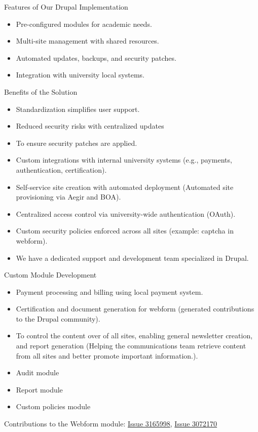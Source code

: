 \begin{frame}{Features of Our Drupal Implementation}
    \begin{itemize}
        \item Pre-configured modules for academic needs.
        \item Multi-site management with shared resources.
        \item Automated updates, backups, and security patches.
        \item Integration with university local systems.
    \end{itemize}
\end{frame}

\begin{frame}{Benefits of the Solution}
    \begin{itemize}
        \item Standardization simplifies user support.
        \item Reduced security risks with centralized updates
        \item To ensure security patches are applied.
        \item Custom integrations with internal university systems (e.g., payments, authentication, certification).
        \item Self-service site creation with automated deployment (Automated site provisioning via Aegir and BOA).
        \item Centralized access control via university-wide authentication (OAuth).
        \item Custom security policies enforced across all sites (example: captcha in webform).
        \item We have a dedicated support and development team specialized in Drupal.
    \end{itemize}
\end{frame}

\begin{frame}{Custom Module Development}
    \begin{itemize}
        \item Payment processing and billing using local payment system.
        \item Certification and document generation for webform (generated contributions to the Drupal community).
        \item To control the content over of all sites, enabling general newsletter creation, and report generation (Helping the communications team retrieve content from all sites and better promote important information.).
        \item Audit module
        \item Report module
        \item Custom policies module
    \end{itemize}
    \vfill
    \footnotesize{Contributions to the Webform module: \href{https://www.drupal.org/project/webform/issues/3165998}{Issue 3165998}, \href{https://www.drupal.org/project/webform/issues/3072170}{Issue 3072170}}
\end{frame}

